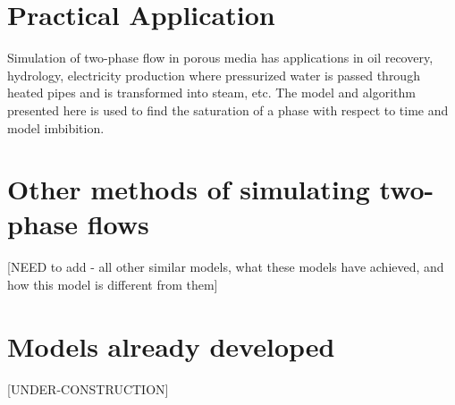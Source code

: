 \section{Practical Application}

	Simulation of two-phase flow in porous media has applications in oil recovery, hydrology, electricity production where pressurized water is passed through heated pipes and is transformed into steam, etc. The model and algorithm presented here is used to find the saturation of a phase with respect to time and model imbibition.

\section{Other methods of simulating two-phase flows}
	[NEED to add - all other similar models, what these models have achieved, and how this model is different from them]
	
\section{Models already developed}

	[UNDER-CONSTRUCTION]
